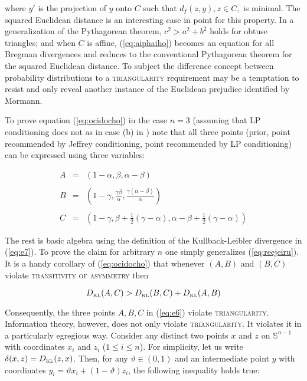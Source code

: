 \documentclass[smallextended]{svjour3}       %
\begin{document}
{\noindent}where $y'$ is the projection of $y$ onto $C$ such that
$d_{f}(z,y),z\in{}C,$ is minimal. The squared Euclidean distance is an
interesting case in point for this property. In a generalization of
the Pythagorean theorem, $c^{2}>a^{2}+b^{2}$ holds for obtuse
triangles; and when $C$ is affine, (\ref{eq:aiphaiho}) becomes an
equation for all Bregman divergences and reduces to the conventional
Pythagorean theorem for the squared Euclidean distance. To subject the
difference concept between probability distributions to a
\textsc{triangularity} requirement may be a temptation to resist and
only reveal another instance of the Euclidean prejudice identified by
Mormann.

To prove equation (\ref{eq:ocidocho}) in the case $n=3$ (assuming that
LP conditioning does not  as in case (b) in
) note that all three points
(prior, point recommended by Jeffrey conditioning, point recommended
by LP conditioning) can be expressed using three variables:

\begin{equation}
  \label{eq:reejeiru}
  \begin{array}{rcl}
    A&=&\left(1-\alpha,\beta,\alpha-\beta\right) \\
     && \\
    B&=&\left(1-\gamma,\frac{\gamma\beta}{\alpha},\frac{\gamma(\alpha-\beta)}{\alpha}\right) \\
     && \\
    C&=&\left(1-\gamma,\beta+\frac{1}{2}(\gamma-\alpha),\alpha-\beta+\frac{1}{2}(\gamma-\alpha)\right)
  \end{array}
\end{equation}

The rest is basic algebra using the definition of the Kullback-Leibler
divergence in (\ref{eq:e7}). To prove the claim for arbitrary $n$
one simply generalizes (\ref{eq:reejeiru}). It is a handy corollary of
(\ref{eq:ocidocho}) that whenever $(A,B)$ and $(B,C)$ violate
\textsc{transitivity of asymmetry} then 

\begin{equation}
  \label{eq:saithain}
  D_{\mbox{\tiny KL}}(A,C)>D_{\mbox{\tiny KL}}(B,C)+D_{\mbox{\tiny KL}}(A,B)
\end{equation}

Consequently, the three points $A,B,C$ in (\ref{eq:e6}) violate
\textsc{triangularity}. Information theory, however, does not only
violate \textsc{triangularity}. It violates it in a particularly
egregious way. Consider any distinct two points $x$ and $z$ on
$\mathbb{S}^{n-1}$ with coordinates $x_{i}$ and $z_{i}$
($1\leq{}i\leq{}n$). For simplicity, let us write
$\delta(x,z)=D_{\mbox{\tiny KL}}(z,x)$. Then, for any
$\vartheta\in{}(0,1)$ and an intermediate point $y$ with coordinates
$y_{i}=\vartheta{}x_{i}+(1-\vartheta)z_{i}$, the following inequality
holds true:
\end{document}
